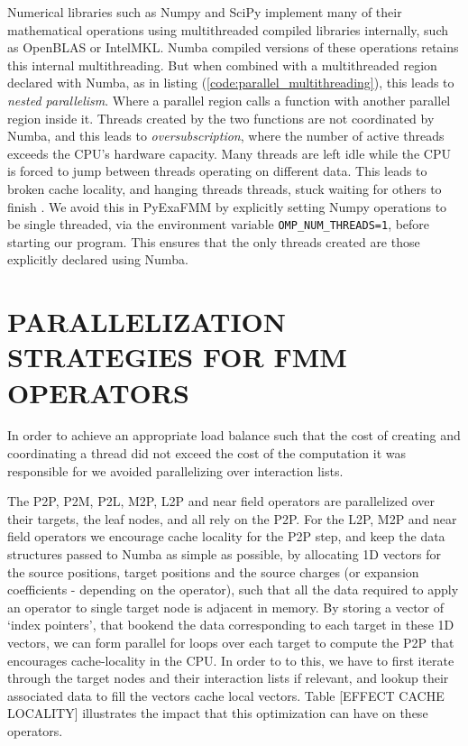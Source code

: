 \documentclass{IEEEcsmag}
\begin{document}
Numerical libraries such as Numpy and SciPy implement many of their mathematical operations using multithreaded compiled libraries internally, such as OpenBLAS or IntelMKL. Numba compiled versions of these operations retains this internal multithreading. But when combined with a multithreaded region declared with Numba, as in listing (\ref{code:parallel_multithreading}), this leads to \textit{nested parallelism}. Where a parallel region calls a function with another parallel region inside it. Threads created by the two functions are not coordinated by Numba, and this leads to \textit{oversubscription}, where the number of active threads exceeds the CPU's hardware capacity. Many threads are left idle while the CPU is forced to jump between threads operating on different data. This leads to broken cache locality, and hanging threads threads, stuck waiting for others to finish \cite{Malakhov2016}. We avoid this in PyExaFMM by explicitly setting Numpy operations to be single threaded, via the environment variable \lstinline{OMP_NUM_THREADS=1}, before starting our program. This ensures that the only threads created are those explicitly declared using Numba.



\section{PARALLELIZATION STRATEGIES FOR FMM OPERATORS}

In order to achieve an appropriate load balance such that the cost of creating and coordinating a thread did not exceed the cost of the computation it was responsible for we avoided parallelizing over interaction lists. 

The P2P, P2M, P2L, M2P, L2P and near field operators are parallelized over their targets, the leaf nodes, and all rely on the P2P. For the L2P, M2P and near field operators we encourage cache locality for the P2P step, and keep the data structures passed to Numba as simple as possible, by allocating 1D vectors for the source positions, target positions and the source charges (or expansion coefficients - depending on the operator), such that all the data required to apply an operator to single target node is adjacent in memory. By storing a vector of `index pointers', that bookend the data corresponding to each target in these 1D vectors, we can form parallel for loops over each target to compute the P2P that encourages cache-locality in the CPU. In order to to this, we have to first iterate through the target nodes and their interaction lists if relevant, and lookup their associated data to fill the vectors cache local vectors. Table [EFFECT CACHE LOCALITY] illustrates the impact that this optimization can have on these operators.
\end{document}
